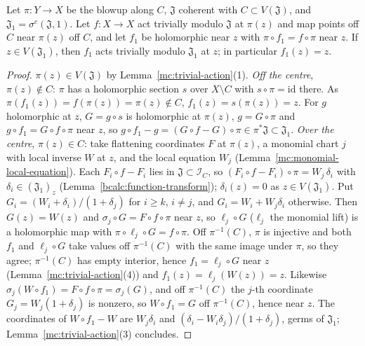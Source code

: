 \begin{theorem}
\label{mc:trivial-action-lift}
\leanok
Let \(\pi\colon Y\to X\) be the blowup along \(C\), \(\mathfrak J\) coherent with \(C\subset V(\mathfrak J)\), and \(\mathfrak J_1=\sigma^c(\mathfrak J,1)\). Let
\(f\colon X\to X\) act trivially modulo \(\mathfrak J\) at \(\pi(z)\) and map points off \(C\) near \(\pi(z)\) off \(C\), and let \(f_1\) be holomorphic near
\(z\) with \(\pi\circ f_1=f\circ\pi\) near \(z\). If \(z\in V(\mathfrak J_1)\), then \(f_1\) acts trivially modulo \(\mathfrak J_1\) at \(z\); in particular
\(f_1(z)=z\).
\end{theorem}
\begin{proof}
\leanok
\(\pi(z)\in V(\mathfrak J)\) by Lemma~\ref{mc:trivial-action}(1).
\emph{Off the centre}, \(\pi(z)\notin C\): \(\pi\) has a holomorphic section \(s\) over \(X\setminus C\) with \(s\circ\pi=\mathrm{id}\) there. As
\(\pi(f_1(z))=f(\pi(z))=\pi(z)\notin C\), \(f_1(z)=s(\pi(z))=z\). For \(g\) holomorphic at \(z\), \(G=g\circ s\) is holomorphic at \(\pi(z)\),
\(g=G\circ\pi\) and \(g\circ f_1=G\circ f\circ\pi\) near \(z\), so \(g\circ f_1-g=(G\circ f-G)\circ\pi\in\pi^*\mathfrak J\subset\mathfrak J_1\).
\emph{Over the centre}, \(\pi(z)\in C\): take flattening coordinates \(F\) at \(\pi(z)\), a monomial chart \(j\) with local inverse \(W\) at \(z\), and the local
equation \(W_j\) (Lemma~\ref{mc:monomial-local-equation}). Each \(F_i\circ f-F_i\) lies in \(\mathfrak J\subset\mathcal I_C\), so
\((F_i\circ f-F_i)\circ\pi=W_j\,\delta_i\) with \(\delta_i\in(\mathfrak J_1)_z\) (Lemma~\ref{bcalc:function-transform}); \(\delta_i(z)=0\) as \(z\in V(\mathfrak J_1)\).
Put \(G_i=(W_i+\delta_i)/(1+\delta_j)\) for \(i\ge k\), \(i\neq j\), and \(G_i=W_i+W_j\delta_i\) otherwise. Then \(G(z)=W(z)\) and
\(\sigma_j\circ G=F\circ f\circ\pi\) near \(z\), so \(\ell_j\circ G\) (\(\ell_j\) the monomial lift) is a holomorphic map with
\(\pi\circ\ell_j\circ G=f\circ\pi\). Off \(\pi^{-1}(C)\), \(\pi\) is injective and both \(f_1\) and \(\ell_j\circ G\) take values off \(\pi^{-1}(C)\) with the same
image under \(\pi\), so they agree; \(\pi^{-1}(C)\) has empty interior, hence \(f_1=\ell_j\circ G\) near \(z\) (Lemma~\ref{mc:trivial-action}(4)) and
\(f_1(z)=\ell_j(W(z))=z\). Likewise \(\sigma_j(W\circ f_1)=F\circ f\circ\pi=\sigma_j(G)\), and off \(\pi^{-1}(C)\) the \(j\)-th coordinate
\(G_j=W_j(1+\delta_j)\) is nonzero, so \(W\circ f_1=G\) off \(\pi^{-1}(C)\), hence near \(z\). The coordinates of \(W\circ f_1-W\) are
\(W_j\delta_i\) and \((\delta_i-W_i\delta_j)/(1+\delta_j)\), germs of \(\mathfrak J_1\); Lemma~\ref{mc:trivial-action}(3) concludes.
\end{proof}
